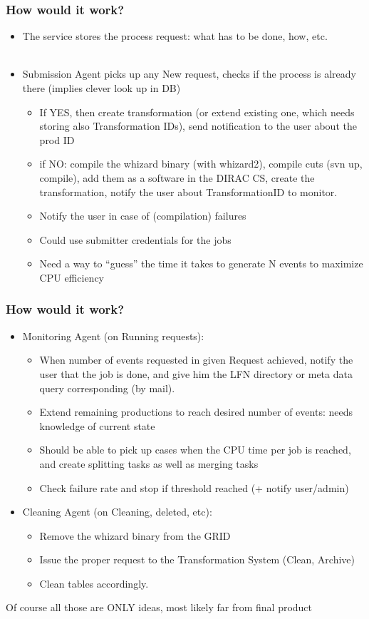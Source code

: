 \documentclass[10pt,table,dvipsnames]{beamer}
\begin{document}
\begin{frame}
\frametitle{How would it work?}
\begin{itemize}
  \item The service stores the process request: what has to be done,
  how, etc.\\
~\\
  \item Submission Agent picks up any New request, checks if the process is
  already there (implies clever look up in DB)
  \begin{itemize}
    \item If YES, then create transformation (or extend existing one,
    which needs storing also Transformation IDs),
    send notification to the user about the prod ID
    \item if NO: compile the whizard binary (with whizard2), compile
    cuts (svn up, compile),  add them as a software in the
    DIRAC CS, create the transformation, notify the user about
    TransformationID to monitor. 
    \item Notify the user in case of
    (compilation) failures
    \item Could use submitter credentials for the jobs
    \item Need a way to ``guess'' the time it takes to generate N
    events to maximize CPU efficiency
  \end{itemize}
\end{itemize}
\end{frame}

\begin{frame}
  \frametitle{How would it work?}
\begin{itemize}
  \item Monitoring Agent (on Running requests): 
  \begin{itemize}
    \item When number of events requested in given
     Request achieved, notify the user that the job is
     done, and give him the LFN directory or meta data query
     corresponding (by mail).
    \item Extend remaining productions to reach desired number of
     events: needs knowledge of current state
    \item Should be able to pick up cases when the CPU time per job is
     reached, and create splitting tasks as well as merging tasks
    \item Check failure rate and stop if threshold reached (+ notify user/admin)
  \end{itemize}
  \item Cleaning Agent (on Cleaning, deleted, etc):
  \begin{itemize}
    \item Remove the whizard binary from the GRID
    \item Issue the proper request to the Transformation System (Clean,
      Archive)
    \item Clean tables accordingly.
  \end{itemize}
\end{itemize}
Of course all those are ONLY ideas, most likely far from final product
\end{frame}
\end{document}
